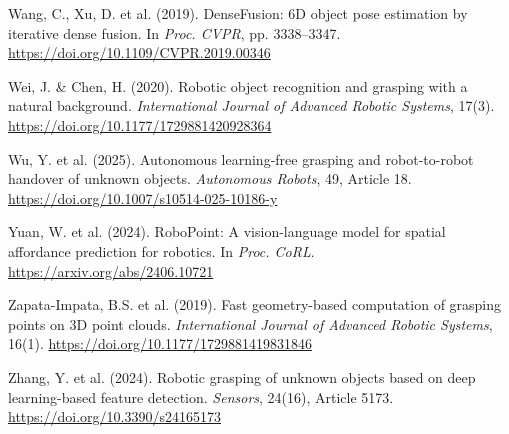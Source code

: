 \documentclass[11pt,a4paper]{article}
\begin{document}
\begin{enumerate}[label={[\arabic*]}, leftmargin=1.2cm, itemsep=3pt]
\item Wang, C., Xu, D. et al. (2019). DenseFusion: 6D object pose estimation by iterative dense fusion. In \textit{Proc. CVPR}, pp. 3338--3347. \href{https://doi.org/10.1109/CVPR.2019.00346}{https://doi.org/10.1109/CVPR.2019.00346}

\item Wei, J. \& Chen, H. (2020). Robotic object recognition and grasping with a natural background. \textit{International Journal of Advanced Robotic Systems}, 17(3). \href{https://doi.org/10.1177/1729881420928364}{https://doi.org/10.1177/1729881420928364}

\item Wu, Y. et al. (2025). Autonomous learning-free grasping and robot-to-robot handover of unknown objects. \textit{Autonomous Robots}, 49, Article 18. \href{https://doi.org/10.1007/s10514-025-10186-y}{https://doi.org/10.1007/s10514-025-10186-y}

\item Yuan, W. et al. (2024). RoboPoint: A vision-language model for spatial affordance prediction for robotics. In \textit{Proc. CoRL}. \href{https://arxiv.org/abs/2406.10721}{https://arxiv.org/abs/2406.10721}

\item Zapata-Impata, B.S. et al. (2019). Fast geometry-based computation of grasping points on 3D point clouds. \textit{International Journal of Advanced Robotic Systems}, 16(1). \href{https://doi.org/10.1177/1729881419831846}{https://doi.org/10.1177/1729881419831846}

\item Zhang, Y. et al. (2024). Robotic grasping of unknown objects based on deep learning-based feature detection. \textit{Sensors}, 24(16), Article 5173. \href{https://doi.org/10.3390/s24165173}{https://doi.org/10.3390/s24165173}

\end{enumerate}
\end{document}
